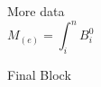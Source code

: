 \documentclass{beamer}
\begin{document}
\begin{frame}[t]
\begin{columns}[t]
\begin{column2}
\begin{block}{More data}
\begin{equation}
 M_(e) = \int_{i}^{n} B_i^{0}
\end{equation}

\lipsum[18][1-5]
		\end{block}

	    \begin{block}{Final Block}
\lipsum[124][1-15]

\vspace*{0.65em}

		\end{block}
	\end{column2}
\end{columns}
\end{frame}
\end{document}

